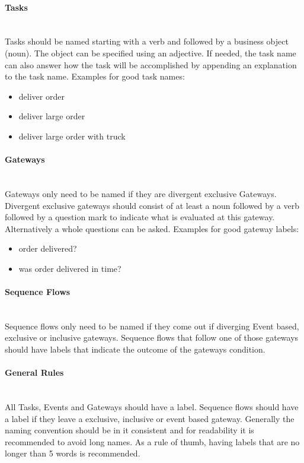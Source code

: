 \paragraph{Tasks}~\\
Tasks should be named starting with a verb and followed by a business object (noun). The object can be specified using an adjective. If needed, the task name can also answer how the task will be accomplished by appending an explanation to the task name. Examples for good task names:
\begin{itemize}
	\item deliver order
	\item deliver large order
	\item deliver large order with truck 
\end{itemize}

\paragraph{Gateways}~\\
Gateways only need to be named if they are divergent exclusive Gateways. Divergent exclusive gateways should consist of at least a noun followed by a verb followed by a question mark to indicate what is evaluated at this gateway. Alternatively a whole questions can be asked. Examples for good gateway labels:
\begin{itemize}
	\item order delivered?
	\item was order delivered in time?
\end{itemize}

\paragraph{Sequence Flows}~\\
Sequence flows only need to be named if they come out if diverging Event based, exclusive or inclusive gateways. Sequence flows that follow one of those gateways should have labels that indicate the outcome of the gateways condition. 

\paragraph{General Rules}~\\
All Tasks, Events and Gateways should have a label. Sequence flows should have a label if they leave a exclusive, inclusive or event based gateway. Generally the naming convention should be in it consistent and for readability it is recommended to avoid long names. As a rule of thumb, having labels that are no longer than 5 words is recommended\cite{fundamentals}. 